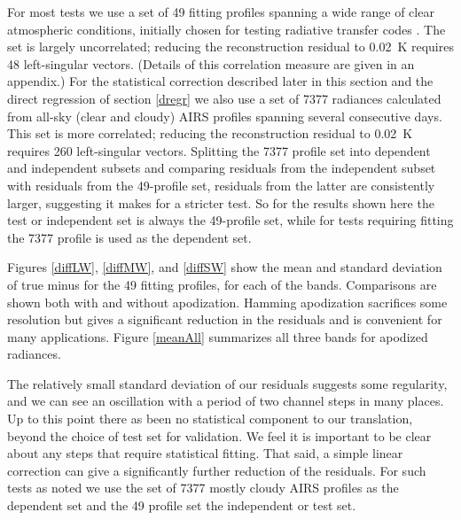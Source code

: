 \documentclass[10pt,twocolumn]{article}
\begin{document}
For most tests we use a set of 49 fitting profiles spanning a wide
range of clear atmospheric conditions, initially chosen for testing
radiative transfer codes \cite{sarta1,sarta2}.  The set is largely
uncorrelated; reducing the reconstruction residual to 0.02~K
requires 48 left-singular vectors.  (Details of this correlation
measure are given in an appendix.)  For the statistical correction
described later in this section and the direct regression of section
\ref{dregr} we also use a set of 7377 radiances calculated from
all-sky (clear and cloudy) AIRS profiles spanning several
consecutive days.  This set is more correlated; reducing the
reconstruction residual to 0.02~K requires 260 left-singular
vectors.  Splitting the 7377 profile set into dependent and
independent subsets and comparing residuals from the independent
subset with residuals from the 49-profile set, residuals from the
latter are consistently larger, suggesting it makes for a stricter
test.  So for the results shown here the test or independent set is
always the 49-profile set, while for tests requiring fitting the
7377 profile is used as the dependent set.

Figures \ref{diffLW}, \ref{diffMW}, and \ref{diffSW} show the mean
and standard deviation of true {\cris} minus {\airs} {\cris} for the
49 fitting profiles, for each of the {\cris} bands.  Comparisons are
shown both with and without apodization.  Hamming apodization
\cite{wiki:wind} sacrifices some resolution but gives a significant
reduction in the residuals and is convenient for many applications.
Figure \ref{meanAll} summarizes all three bands for apodized
radiances.  





The relatively small standard deviation of our residuals suggests
some regularity, and we can see an oscillation with a period of two
channel steps in many places.  Up to this point there as been no
statistical component to our translation, beyond the choice of test
set for validation.  We feel it is important to be clear about any
steps that require statistical fitting.  That said, a simple linear
correction can give a significantly further reduction of the
residuals.  For such tests as noted we use the set of 7377 mostly
cloudy AIRS profiles as the dependent set and the 49 profile set the
independent or test set.
\end{document}
